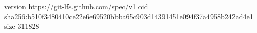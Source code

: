 version https://git-lfs.github.com/spec/v1
oid sha256:b510f3480410ce22e6e69520bbba65c903d14391451e094f37a4958b242ad4e1
size 311828
